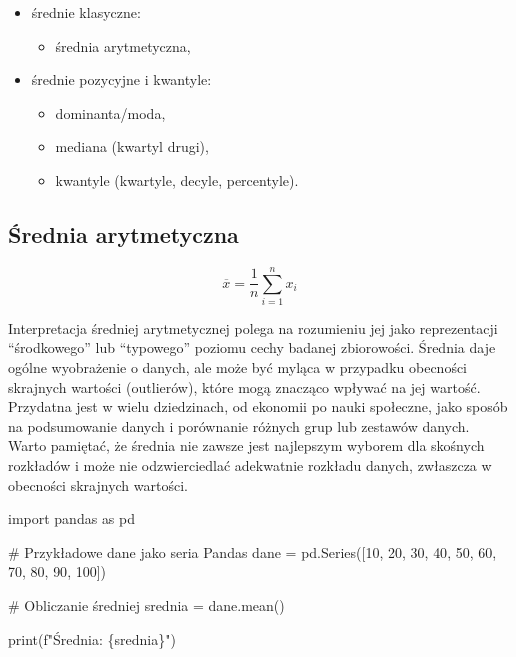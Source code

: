 \documentclass[
  polish,
  letterpaper,
  DIV=11,
  numbers=noendperiod]{scrreprt}
\newenvironment{Shaded}{\begin{snugshade}}{\end{snugshade}}
\newcommand{\BuiltInTok}[1]{\textcolor[rgb]{0.00,0.23,0.31}{#1}}
\newcommand{\CommentTok}[1]{\textcolor[rgb]{0.37,0.37,0.37}{#1}}
\newcommand{\DecValTok}[1]{\textcolor[rgb]{0.68,0.00,0.00}{#1}}
\newcommand{\ImportTok}[1]{\textcolor[rgb]{0.00,0.46,0.62}{#1}}
\newcommand{\NormalTok}[1]{\textcolor[rgb]{0.00,0.23,0.31}{#1}}
\newcommand{\OperatorTok}[1]{\textcolor[rgb]{0.37,0.37,0.37}{#1}}
\newcommand{\SpecialCharTok}[1]{\textcolor[rgb]{0.37,0.37,0.37}{#1}}
\newcommand{\SpecialStringTok}[1]{\textcolor[rgb]{0.13,0.47,0.30}{#1}}
\providecommand{\tightlist}{%
  \setlength{\itemsep}{0pt}\setlength{\parskip}{0pt}}
\begin{document}
\begin{itemize}
\tightlist
\item
  średnie klasyczne:

  \begin{itemize}
  \tightlist
  \item
    średnia arytmetyczna,
  \end{itemize}
\item
  średnie pozycyjne i kwantyle:

  \begin{itemize}
  \tightlist
  \item
    dominanta/moda,
  \item
    mediana (kwartyl drugi),
  \item
    kwantyle (kwartyle, decyle, percentyle).
  \end{itemize}
\end{itemize}

\subsection{Średnia arytmetyczna}\label{ux15brednia-arytmetyczna}

\[\overline{x} = \frac{1}{n} \sum_{i=1}^n x_i\]

Interpretacja średniej arytmetycznej polega na rozumieniu jej jako
reprezentacji ``środkowego'' lub ``typowego'' poziomu cechy badanej
zbiorowości. Średnia daje ogólne wyobrażenie o danych, ale może być
myląca w przypadku obecności skrajnych wartości (outlierów), które mogą
znacząco wpływać na jej wartość. Przydatna jest w wielu dziedzinach, od
ekonomii po nauki społeczne, jako sposób na podsumowanie danych i
porównanie różnych grup lub zestawów danych. Warto pamiętać, że średnia
nie zawsze jest najlepszym wyborem dla skośnych rozkładów i może nie
odzwierciedlać adekwatnie rozkładu danych, zwłaszcza w obecności
skrajnych wartości.

\begin{Shaded}
\begin{Highlighting}[]
\ImportTok{import}\NormalTok{ pandas }\ImportTok{as}\NormalTok{ pd}

\CommentTok{\# Przykładowe dane jako seria Pandas}
\NormalTok{dane }\OperatorTok{=}\NormalTok{ pd.Series([}\DecValTok{10}\NormalTok{, }\DecValTok{20}\NormalTok{, }\DecValTok{30}\NormalTok{, }\DecValTok{40}\NormalTok{, }\DecValTok{50}\NormalTok{, }\DecValTok{60}\NormalTok{, }\DecValTok{70}\NormalTok{, }\DecValTok{80}\NormalTok{, }\DecValTok{90}\NormalTok{, }\DecValTok{100}\NormalTok{])}

\CommentTok{\# Obliczanie średniej}
\NormalTok{srednia }\OperatorTok{=}\NormalTok{ dane.mean()}

\BuiltInTok{print}\NormalTok{(}\SpecialStringTok{f"Średnia: }\SpecialCharTok{\{}\NormalTok{srednia}\SpecialCharTok{\}}\SpecialStringTok{"}\NormalTok{)}
\end{Highlighting}
\end{Shaded}
\end{document}
